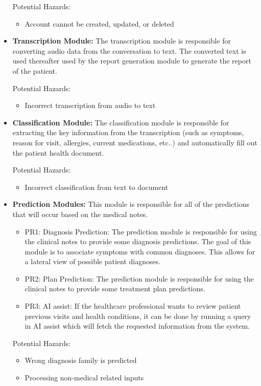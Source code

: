 \documentclass{article}
\begin{document}
\begin{itemize}
    Potential Hazards:
    \begin{itemize}
        \item Account cannot be created, updated, or deleted
    \end{itemize}
    
    \item \textbf{Transcription Module:}
    The transcription module is responsible for converting audio data from the conversation to text. The converted text is used thereafter used by the report generation module to generate the report of the patient.

    Potential Hazards:
    \begin{itemize}
        \item Incorrect transcription from audio to text
    \end{itemize}

    \item \textbf{Classification Module:}
    The classification module is responsible for extracting the key information from the transcription (such as symptoms, reason for visit, allergies, current medications, etc..) and automatically fill out the patient health document.

    Potential Hazards:
    \begin{itemize}
        \item Incorrect classification from text to document
    \end{itemize}

    \item \textbf{Prediction Modules:}
    This module is responsible for all of the predictions that will occur based on the medical notes.

    \begin{itemize}
        \item PR1: Diagnosis Prediction: The prediction module is responsible for using the clinical notes to provide some diagnosis predictions. The goal of this module is to associate symptoms with common diagnoses. This allows for a lateral view of possible patient diagnoses.
        \item PR2: Plan Prediction: The prediction module is responsible for using the clinical notes to provide some treatment plan predictions.
        \item PR3: AI assist: If the healthcare professional wants to review patient previous visits and health conditions, it can be done by running a query in AI assist which will fetch the requested information from the system.  
    \end{itemize}
    
    Potential Hazards:
    \begin{itemize}
        \item Wrong diagnosis family is predicted
        \item Processing non-medical related inputs
    \end{itemize}
    
\end{itemize}
\end{document}
